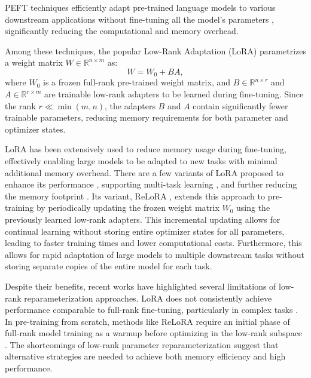 PEFT techniques efficiently adapt pre-trained language models to various downstream applications without fine-tuning all the model's parameters \citep{dingDeltaTuningComprehensive2022}, significantly reducing the computational and memory overhead.

Among these techniques, the popular Low-Rank Adaptation (LoRA) \citep{huLoRALowRankAdaptation2021} parametrizes a weight matrix $W \in \mathbb{R}^{n \times m}$ as:
\begin{equation}
 W = W_0 + BA,
\end{equation}
where $W_0$ is a frozen full-rank pre-trained weight matrix, and $B \in \mathbb{R}^{n \times r}$ and $A \in \mathbb{R}^{r \times m}$ are trainable low-rank adapters to be learned during fine-tuning. Since the rank $r \ll \min(m, n)$, the adapters $B$ and $A$ contain significantly fewer trainable parameters, reducing memory requirements for both parameter and optimizer states.

LoRA has been extensively used to reduce memory usage during fine-tuning, effectively enabling large models to be adapted to new tasks with minimal additional memory overhead. There are a few variants of LoRA proposed to enhance its performance \citep{renduchintalaTiedLoraEnhacingParameter2023, shengSLoRAServingThousands2023, zhangLORAFAMEMORYEFFICIENTLOWRANK, xiaChainLoRAEfficient2024}, supporting multi-task learning \citep{wangMultiLoRADemocratizingLoRA2023}, and further reducing the memory footprint \citep{dettmersQLoRAEfficientFinetuning2023}. Its variant, ReLoRA \citep{lialinReLoRAHighRankTraining2023}, extends this approach to pre-training by periodically updating the frozen weight matrix $W_0$ using the previously learned low-rank adapters. This incremental updating allows for continual learning without storing entire optimizer states for all parameters, leading to faster training times and lower computational costs. Furthermore, this allows for rapid adaptation of large models to multiple downstream tasks without storing separate copies of the entire model for each task.

Despite their benefits, recent works have highlighted several limitations of low-rank reparameterization approaches. LoRA does not consistently achieve performance comparable to full-rank fine-tuning, particularly in complex tasks \citep{xiaChainLoRAEfficient2024}. In pre-training from scratch, methods like ReLoRA require an initial phase of full-rank model training as a warmup before optimizing in the low-rank subspace \citep{lialinReLoRAHighRankTraining2023}. The shortcomings of low-rank parameter reparameterization suggest that alternative strategies are needed to achieve both memory efficiency and high performance.

